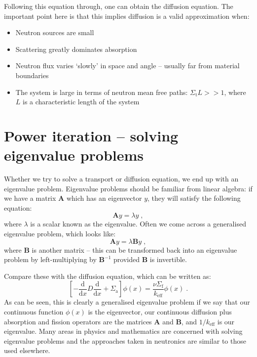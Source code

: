 \documentclass{article}
\begin{document}
Following this equation through, one can obtain the diffusion equation. The important point here is that this implies diffusion is a valid approximation when:
\begin{itemize}
    \item Neutron sources are small
    \item Scattering greatly dominates absorption
    \item Neutron flux varies `slowly' in space and angle -- usually far from material boundaries
    \item The system is large in terms of neutron mean free paths: $\Sigma_\mathrm{t}L >> 1$, where $L$ is a characteristic length of the system
\end{itemize}

\section{Power iteration -- solving eigenvalue problems}

Whether we try to solve a transport or diffusion equation, we end up with an eigenvalue problem. Eigenvalue problems should be familiar from linear algebra: if we have a matrix $\mathbf{A}$ which has an eigenvector $y$, they will satisfy the following equation:
\begin{equation}
    \mathbf{A}y = \lambda y\;\mathrm{,}
\end{equation}
where $\lambda$ is a scalar known as the eigenvalue. Often we come across a generalised eigenvalue problem, which looks like:
\begin{equation}
    \mathbf{A}y = \lambda \mathbf{B}y\;\mathrm{,}
\end{equation}
where $\mathbf{B}$ is another matrix -- this can be transformed back into an eigenvalue problem by left-multiplying by $\mathbf{B}^{-1}$ provided $\mathbf{B}$ is invertible.

Compare these with the diffusion equation, which can be written as:
\begin{equation}\label{eq:diffusion_operators}
    \left[-\frac{\mathrm{d}}{\mathrm{d}x}D\frac{\mathrm{d}}{\mathrm{d}x} + \Sigma_\mathrm{a}\right] \phi(x) = \frac{\nu\Sigma_\mathrm{f}}{k_\mathrm{eff}}\phi(x)\;\mathrm{.}
\end{equation}
As can be seen, this is clearly a generalised eigenvalue problem if we say that our continuous function $\phi(x)$ is the eigenvector, our continuous diffusion plus absorption and fission operators are the matrices $\mathbf{A}$ and $\mathbf{B}$, and $1/k_\mathrm{eff}$ is our eigenvalue. Many areas in physics and mathematics are concerned with solving eigenvalue problems and the approaches taken in neutronics are similar to those used elsewhere.
\end{document}
